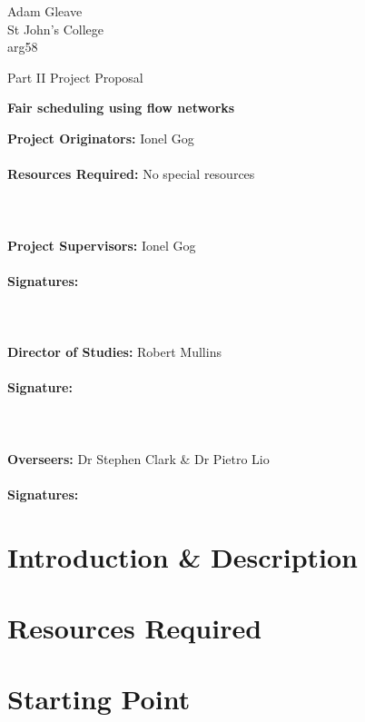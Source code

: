 \begin{flushright}
	\small {
		Adam Gleave \\
		St John's College \\
		arg58
	}
\end{flushright}

\vfill

\centerline{\Large Part II Project Proposal}
\vspace{0.4in}
\centerline{\LARGE \textbf{Fair scheduling using flow networks }}
\vspace{0.4in}
\centerline{}

\vfill

\textbf{Project Originators:} Ionel Gog \hfil \\ \\
\textbf{Resources Required:} No special resources \hfil \\ \\ \\ \\
\textbf{Project Supervisors:} Ionel Gog \hfil \\ \\
\textbf{Signatures:} \hfil \\ \\ \\ \\
\textbf{Director of Studies:} Robert Mullins \hfil \\ \\
\textbf{Signature:} \hfil \\ \\ \\ \\
\textbf{Overseers:} Dr Stephen Clark \& Dr Pietro Lio \hfil \\ \\
\textbf{Signatures:} \hfil \\

\vfil 

\section*{Introduction \& Description}


\section*{Resources Required}


\section*{Starting Point}

